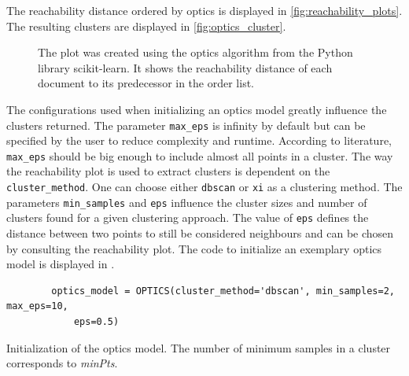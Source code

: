The reachability distance ordered by \ac{optics} is displayed in \autoref{fig:reachability_plots}.
The resulting clusters are displayed in \autoref{fig:optics_cluster}.

\begin{figure}%
    \centering
    \qquad
    \caption[Reachability distances]{The plot was created using the \ac{optics} algorithm from the Python library scikit-learn.
    It shows the reachability distance of each document to its predecessor in the order list.}%
    \label{fig:reachability_plots}%
\end{figure}

The configurations used when initializing an \ac{optics} model greatly influence the clusters returned.
The parameter \texttt{max\_eps} is infinity by default but can be specified by the user to reduce complexity and runtime.
According to literature, \texttt{max\_eps} should be big enough to include almost all points in a cluster.
The way the reachability plot is used to extract clusters is dependent on the \texttt{cluster\_method}. 
One can choose either \texttt{dbscan} or \texttt{xi} as a clustering method.
The parameters \texttt{min\_samples} and \texttt{eps} influence the cluster sizes and number of clusters found for a given clustering approach.
The value of \texttt{eps} defines the distance between two points to still be considered neighbours 
and can be chosen by consulting the reachability plot.
The code to initialize an exemplary \ac{optics} model is displayed in .

\begin{listing}[htp]
    \begin{verbatim}
        optics_model = OPTICS(cluster_method='dbscan', min_samples=2, max_eps=10, 
            eps=0.5)
    \end{verbatim}
    \caption{Initialization of the \ac{optics} model.
    The number of minimum samples in a cluster corresponds to \textit{minPts}.
    }
    \label{lst:optics_model}
\end{listing}
